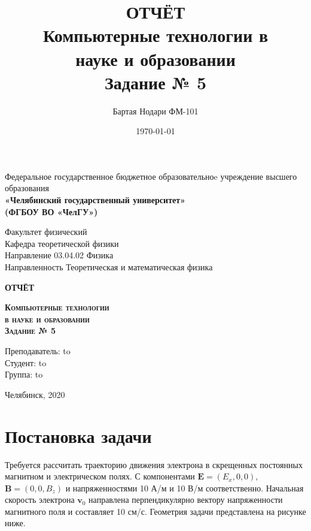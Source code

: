 \documentclass[a4paper]{article}
\author{Бартая Нодари ФМ-101}
\title{ОТЧЁТ\\ Компьютерные технологии в\\ науке и образовании\\ Задание № 5}
\date{\today}
\begin{document}
\begin{titlepage}
	\begin{center}
	Федеральное государственное бюджетное образовательноe учреждение высшего образования \\
	\textbf{«Челябинский государственный университет» \\ (ФГБОУ ВО «ЧелГУ»)}
	\end{center}
	\begin{center}
		Факультет физический			\\
		Кафедра теоретической физики	\\
		Направление 03.04.02 Физика		\\
		Направленность Теоретическая и математическая физика
	\end{center}
	\vfill
	\begin{center}
		\textbf{ОТЧЁТ}
	\end{center}
	\begin{center}
		\textsc{\textbf{Компьютерные технологии\\ в науке и образовании\\ Задание № 5}}
	\end{center}
	\vfill
	\newbox{\lbox}
	\newlength{\maxl}
	\setlength{\maxl}{\wd\lbox}
	\hfill\parbox{10cm}{
		\begin{flushright}
		\hfill Преподаватель:   \hbox to\\
		\hfill Студент:   \hbox to\\
		\hfill Группа:   \hbox to\\
		\end{flushright}
	}
	\vfill
	\begin{center}
		Челябинск, 2020	
	\end{center}
\end{titlepage}

\tableofcontents
\setcounter{page}{2}
\newpage
\section{Постановка задачи}
Требуется рассчитать траекторию движения электрона в скрещенных
постоянных магнитном и электрическом полях. 
С компонентами $\mathbf{E}=(E_x, 0, 0)$, $\mathbf{B}=(0, 0, B_z)$ и напряженностями 10 А/м и 10 В/м  соответственно. 
Начальная скорость электрона $\mathbf{v}_0$ направлена перпендикулярно вектору напряженности магнитного поля и составляет 10 см/с.
Геометрия задачи представлена на рисунке ниже.%
\end{document}
